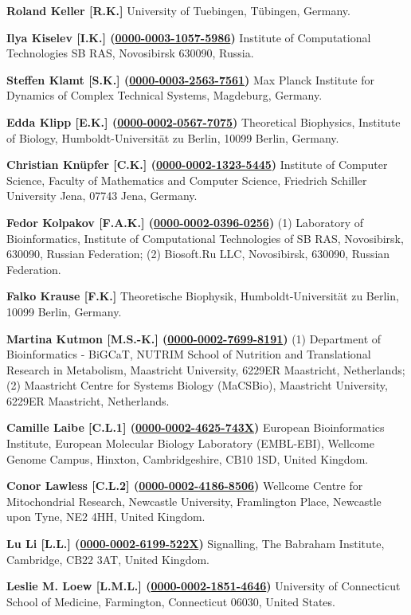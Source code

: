 \documentclass{sbml-paper}
\newcommand{\orcid}[1]{\href{https://orcid.org/#1}{#1}}
\begin{document}
\textbf{Roland Keller [R.K.]} University of Tuebingen, T\"{u}bingen, Germany.

\textbf{Ilya Kiselev [I.K.] (\orcid{0000-0003-1057-5986})} Institute of Computational Technologies SB RAS, Novosibirsk 630090, Russia.

\textbf{Steffen Klamt [S.K.] (\orcid{0000-0003-2563-7561})} Max Planck Institute for Dynamics of Complex Technical Systems, Magdeburg, Germany.

\textbf{Edda Klipp [E.K.] (\orcid{0000-0002-0567-7075})} Theoretical Biophysics, Institute of Biology, Humboldt-Universit\"{a}t zu Berlin, 10099 Berlin, Germany.

\textbf{Christian Kn\"{u}pfer [C.K.] (\orcid{0000-0002-1323-5445})} Institute of Computer Science, Faculty of Mathematics and Computer Science, Friedrich Schiller University Jena, 07743 Jena, Germany.

\textbf{Fedor Kolpakov [F.A.K.] (\orcid{0000-0002-0396-0256})} (1) Laboratory of Bioinformatics, Institute of Computational Technologies of SB RAS, Novosibirsk, 630090, Russian Federation; (2) Biosoft.Ru LLC, Novosibirsk, 630090, Russian Federation.

\textbf{Falko Krause [F.K.]} Theoretische Biophysik, Humboldt-Universit\"{a}t zu Berlin, 10099 Berlin, Germany.

\textbf{Martina Kutmon [M.S.-K.] (\orcid{0000-0002-7699-8191})} (1) Department of Bioinformatics - BiGCaT, NUTRIM School of Nutrition and Translational Research in Metabolism, Maastricht University, 6229ER Maastricht, Netherlands; (2) Maastricht Centre for Systems Biology (MaCSBio), Maastricht University, 6229ER Maastricht, Netherlands.

\textbf{Camille Laibe [C.L.1] (\orcid{0000-0002-4625-743X})} European Bioinformatics Institute, European Molecular Biology Laboratory (EMBL-EBI), Wellcome Genome Campus, Hinxton, Cambridgeshire, CB10 1SD, United Kingdom.

\textbf{Conor Lawless [C.L.2] (\orcid{0000-0002-4186-8506})} Wellcome Centre for Mitochondrial Research, Newcastle University, Framlington Place, Newcastle upon Tyne, NE2 4HH, United Kingdom.

\textbf{Lu Li [L.L.] (\orcid{0000-0002-6199-522X})} Signalling, The Babraham Institute, Cambridge, CB22 3AT, United Kingdom.

\textbf{Leslie M. Loew [L.M.L.] (\orcid{0000-0002-1851-4646})} University of Connecticut School of Medicine, Farmington, Connecticut 06030, United States.
\end{document}
